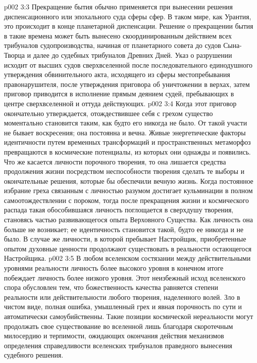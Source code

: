 \vs p002 3:3 Прекращение бытия обычно применяется при вынесении решения диспенсационного или эпохального суда сферы сфер. В таком мире, как Урантия, это происходит в конце планетарной диспенсации. Решение о прекращении бытия в такие времена может быть вынесено скоординированным действием всех трибуналов судопроизводства, начиная от планетарного совета до судов Сына\hyp{}Творца и далее до судебных трибуналов Древних Дней. Указ о разрушении исходит от высших судов сверхвселенной после последовательного единодушного утверждения обвинительного акта, исходящего из сферы местопребывания правонарушителя, после утверждения приговора об уничтожении в верхах, затем приговор приводится в исполнение прямым деянием судей, пребывающих в центре сверхвселенной и оттуда действующих.
\vs p002 3:4 Когда этот приговор окончательно утверждается, отождествившее себя с грехом существо моментально становится таким, как будто его никогда не было. От такой участи не бывает воскресения; она постоянна и вечна. Живые энергетические факторы идентичности путем временных трансформаций и пространственных метаморфоз превращаются в космические потенциалы, из которых они однажды и появились. Что же касается личности порочного творения, то она лишается средства продолжения жизни посредством неспособности творения сделать те выборы и окончательные решения, которые бы обеспечили вечную жизнь. Когда постоянное избрание греха связанным с личностью разумом достигает кульминации в полном самоотождествлении с пороком, тогда после прекращения жизни и космического распада такая обособившаяся личность поглощается в сверхдушу творения, становясь частью развивающегося опыта Верховного Существа. Как личность она больше не возникает; ее идентичность становится такой, будто ее никогда и не было. В случае же личности, в которой пребывает Настройщик, приобретенные опытом духовные ценности продолжают существовать в реальности остающегося Настройщика.
\vs p002 3:5 \pc В любом вселенском состязании между действительными уровнями реальности личность более высокого уровня в конечном итоге побеждает личность более низкого уровня. Этот неизбежный исход вселенского спора обусловлен тем, что божественность качества равняется степени реальности или действительности любого творения, наделенного волей. Зло в чистом виде, полная ошибка, умышленный грех и явная порочность по сути и автоматически самоубийственны. Такие позиции космической нереальности могут продолжать свое существование во вселенной лишь благодаря скоротечным милосердию и терпимости, ожидающих окончания действия механизмов определения справедливости вселенских трибуналов праведного вынесения судебного решения.

